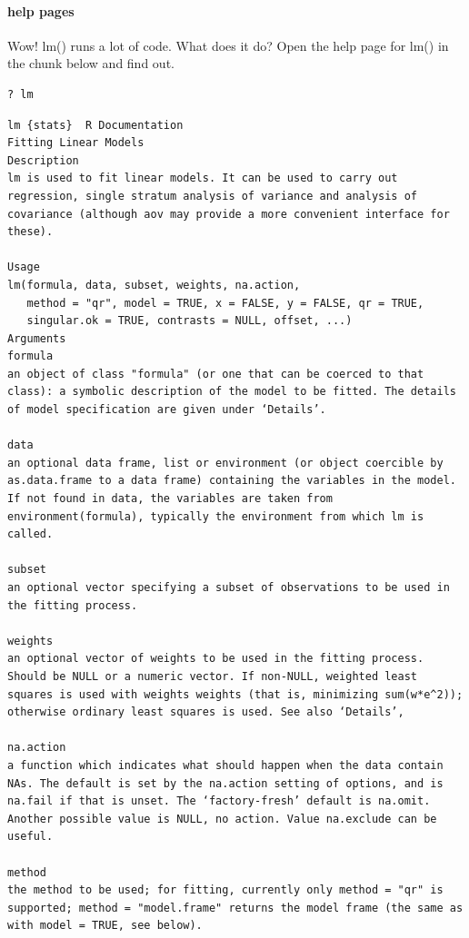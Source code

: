 \documentclass[
]{article}
\begin{document}
\hypertarget{help-pages}{%
\paragraph{help pages}\label{help-pages}}

Wow! lm() runs a lot of code. What does it do? Open the help page for
lm() in the chunk below and find out.

\begin{verbatim}
? lm
\end{verbatim}

\begin{verbatim}
lm {stats}  R Documentation
Fitting Linear Models
Description
lm is used to fit linear models. It can be used to carry out regression, single stratum analysis of variance and analysis of covariance (although aov may provide a more convenient interface for these).

Usage
lm(formula, data, subset, weights, na.action,
   method = "qr", model = TRUE, x = FALSE, y = FALSE, qr = TRUE,
   singular.ok = TRUE, contrasts = NULL, offset, ...)
Arguments
formula 
an object of class "formula" (or one that can be coerced to that class): a symbolic description of the model to be fitted. The details of model specification are given under ‘Details’.

data    
an optional data frame, list or environment (or object coercible by as.data.frame to a data frame) containing the variables in the model. If not found in data, the variables are taken from environment(formula), typically the environment from which lm is called.

subset  
an optional vector specifying a subset of observations to be used in the fitting process.

weights 
an optional vector of weights to be used in the fitting process. Should be NULL or a numeric vector. If non-NULL, weighted least squares is used with weights weights (that is, minimizing sum(w*e^2)); otherwise ordinary least squares is used. See also ‘Details’,

na.action   
a function which indicates what should happen when the data contain NAs. The default is set by the na.action setting of options, and is na.fail if that is unset. The ‘factory-fresh’ default is na.omit. Another possible value is NULL, no action. Value na.exclude can be useful.

method  
the method to be used; for fitting, currently only method = "qr" is supported; method = "model.frame" returns the model frame (the same as with model = TRUE, see below).


\end{verbatim}
\end{document}

